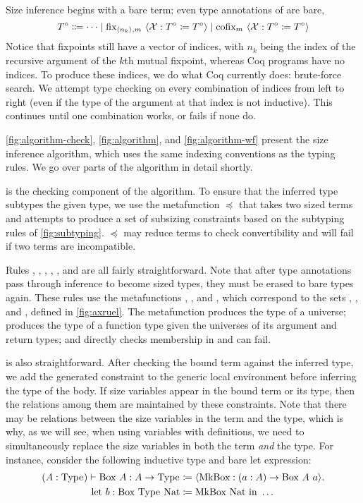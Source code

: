 


Size inference begins with a bare term; even type annotations of \cofixpoints are bare, \ie
  $$T^\circ \Coloneqq \dots
    \mid \fix{\seq{n_k}, m}{\mathcal{X}}{T^\circ}{T^\circ}
    \mid \cofix{m}{\mathcal{X}}{T^\circ}{T^\circ}$$
Notice that fixpoints still have a vector of indices, with $n_k$ being the index of the recursive argument of the $k$th mutual fixpoint, whereas Coq programs have no indices.
To produce these indices, we do what Coq currently does: brute-force search.
We attempt type checking on every combination of indices from left to right (even if the type of the argument at that index is not inductive).
This continues until one combination works, or fails if none do.

\autoref{fig:algorithm-check}, \autoref{fig:algorithm}, and \autoref{fig:algorithm-wf} present the size inference algorithm, which uses the same indexing conventions as the typing rules.
We go over parts of the algorithm in detail shortly.

 is the checking component of the algorithm.
To ensure that the inferred type subtypes the given type, we use the metafunction $\preceq$ that takes two sized terms and attempts to produce a set of subsizing constraints based on the subtyping rules of \autoref{fig:subtyping}.
$\preceq$ may reduce terms to check convertibility and will fail if two terms are incompatible.

Rules , , , , , and  are all fairly straightforward.
Note that after type annotations pass through inference to become sized types, they must be erased to bare types again.
These rules use the metafunctions \axiom, , and \elim, which correspond to the sets \Axioms, \Rules, and \Elims, defined in \autoref{fig:axruel}.
The metafunction \axiom produces the type of a universe;  produces the type of a function type given the universes of its argument and return types; and \elim directly checks membership in \Elims and can fail.

 is also straightforward.
After checking the bound term against the inferred type, we add the generated constraint to the generic local environment before inferring the type of the body.
If size variables appear in the bound term or its type, then the relations among them are maintained by these constraints.
Note that there may be relations between the size variables in the term and the type, which is why, as we will see, when using variables with definitions, we need to simultaneously replace the size variables in both the term \textit{and} the type.
For instance, consider the following inductive type and bare let expression:
\begin{align*}
  (A : \text{Type}_{}) \vdash \text{Box} ~ A: A \to \text{Type}_{} &\coloneqq
    \langle \text{MkBox} : (a : A) \to \text{Box} ~ A ~ a\rangle.\\
  \text{let}\ b : \text{Box} ~ \text{Type}_{} ~ \text{Nat}& \coloneqq \text{MkBox} ~ \text{Nat}\ \text{in}\ \dots
\end{align*}

